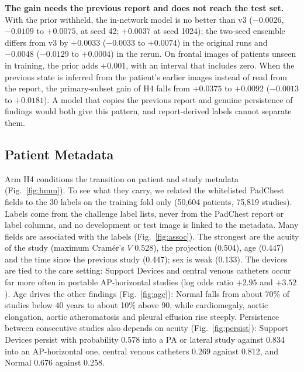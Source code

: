 \documentclass[conference]{IEEEtran}
\begin{document}
\textbf{The gain needs the previous report and does not reach the test set.} With the prior withheld, the in-network model is no better than v3 ($-0.0026$, $-0.0109$ to $+0.0075$, at seed 42; $+0.0037$ at seed 1024); the two-seed ensemble differs from v3 by $+0.0033$ ($-0.0033$ to $+0.0074$) in the original runs and $-0.0048$ ($-0.0129$ to $+0.0004$) in the rerun. On frontal images of patients unseen in training, the prior adds $+0.001$, with an interval that includes zero. When the previous state is inferred from the patient's earlier images instead of read from the report, the primary-subset gain of H4 falls from $+0.0375$ to $+0.0092$ ($-0.0013$ to $+0.0181$). A model that copies the previous report and genuine persistence of findings would both give this pattern, and report-derived labels cannot separate them.

\subsection{Patient Metadata}
\label{sec:mk-meta}
Arm H4 conditions the transition on patient and study metadata (Fig.~\ref{fig:hmm}). To see what they carry, we related the whitelisted PadChest fields to the 30 labels on the training fold only (50,604 patients, 75,819 studies). Labels come from the challenge label lists, never from the PadChest report or label columns, and no development or test image is linked to the metadata. Many fields are associated with the labels (Fig.~\ref{fig:assoc}). The strongest are the acuity of the study (maximum Cram\'er's $V$ 0.528), the projection (0.504), age (0.447) and the time since the previous study (0.447); sex is weak (0.133). The devices are tied to the care setting: Support Devices and central venous catheters occur far more often in portable AP-horizontal studies (log odds ratio $+2.95$ and $+3.52$). Age drives the other findings (Fig.~\ref{fig:age}): Normal falls from about 70\% of studies below 40 years to about 10\% above 90, while cardiomegaly, aortic elongation, aortic atheromatosis and pleural effusion rise steeply. Persistence between consecutive studies also depends on acuity (Fig.~\ref{fig:persist}): Support Devices persist with probability 0.578 into a PA or lateral study against 0.834 into an AP-horizontal one, central venous catheters 0.269 against 0.812, and Normal 0.676 against 0.258.
\end{document}
